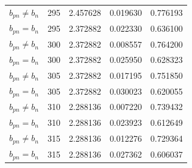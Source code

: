 \begin{longtable}{l r r r r}
$b_{pn} \neq b_n$ & 295 & 2.457628 & 0.019630 & 0.776193 \\
$b_{pn} = b_n$ & 295 & 2.372882 & 0.022330 & 0.636100 \\
$b_{pn} \neq b_n$ & 300 & 2.372882 & 0.008557 & 0.764200 \\
$b_{pn} = b_n$ & 300 & 2.372882 & 0.025950 & 0.628323 \\
$b_{pn} \neq b_n$ & 305 & 2.372882 & 0.017195 & 0.751850 \\
$b_{pn} = b_n$ & 305 & 2.372882 & 0.030023 & 0.620055 \\
$b_{pn} \neq b_n$ & 310 & 2.288136 & 0.007220 & 0.739432 \\
$b_{pn} = b_n$ & 310 & 2.288136 & 0.023923 & 0.612649 \\
$b_{pn} \neq b_n$ & 315 & 2.288136 & 0.012276 & 0.729364 \\
$b_{pn} = b_n$ & 315 & 2.288136 & 0.027362 & 0.606037 \\
        \end{longtable}
